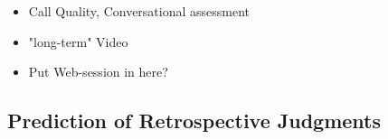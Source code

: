 \begin{itemize}
\item Call Quality, Conversational assessment
\item "long-term" Video
\item Put Web-session in here?
\end{itemize}


\subsection{Prediction of Retrospective Judgments}
